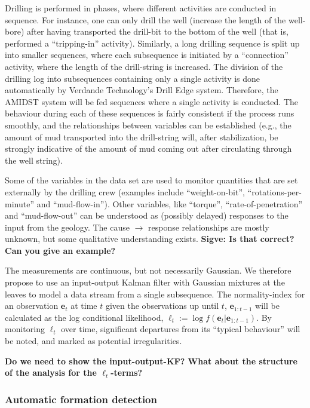 Drilling is performed in phases, where different activities are conducted in sequence. For instance, one can only drill the well (increase the length of the well-bore) after having transported the drill-bit to the bottom of the well (that is, performed a ``tripping-in'' activity). Similarly, a long drilling sequence is split up into smaller sequences, where each subsequence is initiated by a ``connection'' activity, where the length of the drill-string is increased.
The division of the drilling log into subsequences containing only a single activity is done automatically by Verdande Technology's Drill Edge system. 
Therefore, the AMIDST system will be fed sequences where a single activity is conducted. 
The behaviour during each of these sequences  is fairly consistent if the process runs smoothly, and the relationships between variables can be established (e.g., the amount of mud transported into the drill-string will, after stabilization, be strongly indicative of the amount of mud coming out after circulating through the well string). 

Some of the variables in the data set are used to monitor quantities that are set externally by the drilling crew (examples include ``weight-on-bit'', ``rotations-per-minute'' and ``mud-flow-in''). Other variables, like ``torque'', ``rate-of-penetration'' and ``mud-flow-out'' can be understood as  (possibly delayed) responses to the input from the geology. The cause $\rightarrow$ response relationships are mostly unknown, but some qualitative understanding exists. {\bf Sigve: Is that correct? Can you give an example?}

The measurements are continuous, but not necessarily Gaussian. We therefore propose to use an input-output Kalman filter with Gaussian mixtures at the leaves to model a data stream from a single subsequence. The normality-index for an observation ${\bm e}_t$ at time $t$ given the observations up until $t$, ${\bm e}_{1:t-1}$ will be calculated as the log conditional likelihood,  $\ell_t := \log f\left({\bm e}_t|{\bm e}_{1:t-1}\right)$. By monitoring  $\ell_t$ over time, significant departures from its ``typical behaviour'' will be noted, and marked as potential irregularities.

{\bf Do we need to show the input-output-KF? What about the structure of the analysis for the $\ell_t$-terms?}


\subsubsection{Automatic formation detection}


